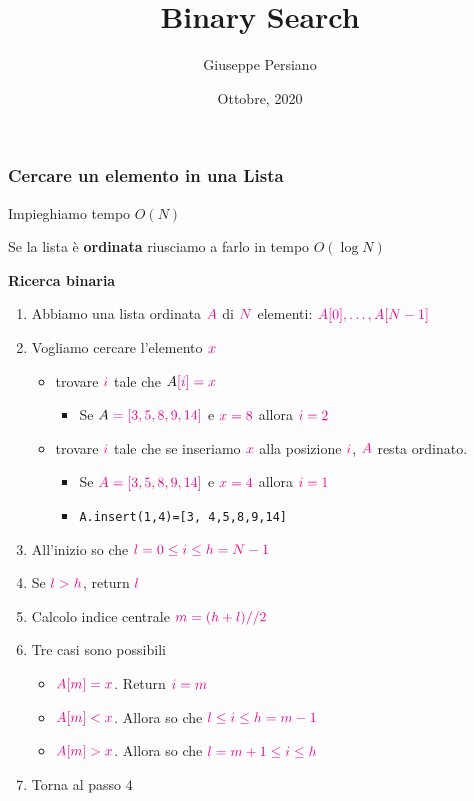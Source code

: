 \documentclass[]{beamer}
\title[]{Binary Search}
\author{Giuseppe Persiano}
\institute[UNISA]{%
Universit\`a di Salerno\\ \qquad \\
}
\date[Ottobre 2020]{Ottobre, 2020}
\begin{document}
{
\begin{frame}
  \titlepage
\end{frame}

\begin{frame}
\frametitle{Cercare un elemento in una Lista}

Impieghiamo tempo $O(N)$

Se la lista \`e {\bf ordinata} riusciamo a farlo in tempo $O(\log N)$
\end{frame}

\begin{frame}
\begin{block}{\bf Ricerca binaria}
\begin{enumerate}[<+->]
\color{blue}
\item Abbiamo una lista ordinata $\color{magenta} A$ di $\color{magenta} N$ elementi: $\color{magenta} A[0],\ldots,A[N-1]$
\item\color{blue} Vogliamo cercare l'elemento $\color{magenta} x$
    \begin{itemize}
        \color{blue}
        \item trovare $\color{magenta} i$ tale che $A\color{magenta} [i]=x$
            \begin{itemize}
            \color{blue}
            \item Se $A\color{magenta} =[3,5,8,9,14]$ e $\color{magenta} x=8$ allora $\color{magenta} i=2$
            \end{itemize}
        \item trovare $\color{magenta} i$ tale che se inseriamo $\color{magenta} x$ alla posizione $\color{magenta} i$, $\color{magenta} A$ resta ordinato.
            \begin{itemize}
            \color{blue}
            \item Se $\color{magenta} A=[3,5,8,9,14]$ e $\color{magenta} x=4$ allora $\color{magenta} i=1$
            \item {\tt A.insert(1,4)=[3,{\color{green} 4},5,8,9,14]}
            \end{itemize}
    \end{itemize}
\item All'inizio so che $\color{magenta} l=0\leq i\leq h=N-1$
\item Se $\color{magenta} l>h$, return $\color{magenta} l$
\item Calcolo indice centrale $\color{magenta} m=(h+l)//2$
\item Tre casi sono possibili
    \begin{itemize}
            \color{blue}
        \item $\color{magenta} A[m]=x$. Return $\color{magenta} i=m$
        \item $\color{magenta} A[m]<x$. Allora so che $\color{magenta} l\leq i\leq h=m-1$
        \item $\color{magenta} A[m]>x$. Allora so che $\color{magenta} l=m+1\leq i\leq h$
    \end{itemize}
\item Torna al passo $4$


\end{enumerate}
\end{block}
\end{frame}}
\end{document}

